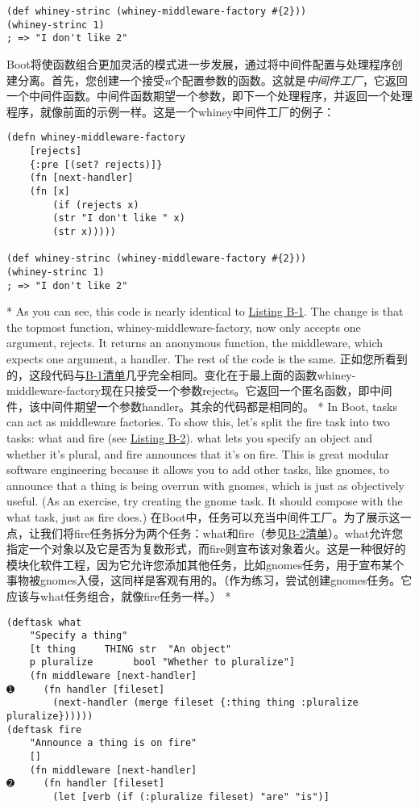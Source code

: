 \begin{paracol}{2}
\begin{verbatim}
(def whiney-strinc (whiney-middleware-factory #{2}))
(whiney-strinc 1)
; => "I don't like 2"
\end{verbatim}
\switchcolumn
Boot将使函数组合更加灵活的模式进一步发展，通过将中间件配置与处理程序创建分离。首先，您创建一个接受\emph{n}个配置参数的函数。这就是\emph{中间件工厂}，它返回一个中间件函数。中间件函数期望一个参数，即下一个处理程序，并返回一个处理程序，就像前面的示例一样。这是一个whiney中间件工厂的例子：
\begin{verbatim}
(defn whiney-middleware-factory
    [rejects]
    {:pre [(set? rejects)]}
    (fn [next-handler]
    (fn [x]
        (if (rejects x)
        (str "I don't like " x)
        (str x)))))

(def whiney-strinc (whiney-middleware-factory #{2}))
(whiney-strinc 1)
; => "I don't like 2"
\end{verbatim}
\switchcolumn[0]*
As you can see, this code is nearly identical to
\href{javascript:void(0)}{Listing B-1}. The change is that the topmost
function, whiney-middleware-factory, now only accepts one argument,
rejects. It returns an anonymous function, the middleware, which expects
one argument, a handler. The rest of the code is the same.
\switchcolumn
正如您所看到的，这段代码与\href{javascript:void(0)}{B-1清单}几乎完全相同。变化在于最上面的函数whiney-middleware-factory现在只接受一个参数rejects。它返回一个匿名函数，即中间件，该中间件期望一个参数handler。其余的代码都是相同的。
\switchcolumn[0]*
In Boot, tasks can act as middleware factories. To show this, let's
split the fire task into two tasks: what and fire (see
\href{javascript:void(0)}{Listing B-2}). what lets you specify an object
and whether it's plural, and fire announces that it's on fire. This is
great modular software engineering because it allows you to add other
tasks, like gnomes, to announce that a thing is being overrun with
gnomes, which is just as objectively useful. (As an exercise, try
creating the gnome task. It should compose with the what task, just as
fire does.)
\switchcolumn
在Boot中，任务可以充当中间件工厂。为了展示这一点，让我们将fire任务拆分为两个任务：what和fire（参见\href{javascript:void(0)}{B-2清单}）。what允许您指定一个对象以及它是否为复数形式，而fire则宣布该对象着火。这是一种很好的模块化软件工程，因为它允许您添加其他任务，比如gnomes任务，用于宣布某个事物被gnomes入侵，这同样是客观有用的。（作为练习，尝试创建gnomes任务。它应该与what任务组合，就像fire任务一样。）
\switchcolumn[0]*
\begin{verbatim}
(deftask what
    "Specify a thing"
    [t thing     THING str  "An object"
    p pluralize       bool "Whether to pluralize"]
    (fn middleware [next-handler]
➊     (fn handler [fileset]
        (next-handler (merge fileset {:thing thing :pluralize pluralize})))))
(deftask fire
    "Announce a thing is on fire"
    []
    (fn middleware [next-handler]
➋     (fn handler [fileset]
        (let [verb (if (:pluralize fileset) "are" "is")]


\end{verbatim}
\end{paracol}
